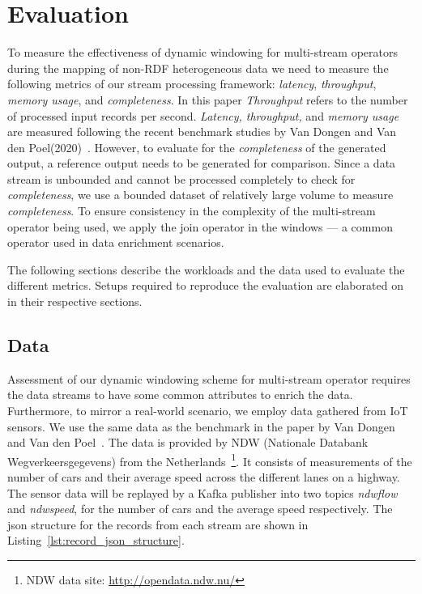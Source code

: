 \chapter{Evaluation}
\label{chap:Evaluation}

To measure the effectiveness of dynamic windowing for multi-stream operators during the 
mapping of non-RDF heterogeneous data we need to measure the following 
metrics of our stream processing framework: \emph{latency}, \emph{throughput},
\emph{memory usage}, and \emph{completeness}. In this paper \emph{Throughput} refers to the number of processed input records per second.
\emph{Latency, throughput,} and \emph{memory usage} are measured following the recent benchmark studies by 
Van Dongen and Van den Poel(2020)~\cite{evalution_of_spe}. 
However, to evaluate 
for the \emph{completeness}
of the generated output, a reference output needs 
to be generated for comparison. Since a data stream is unbounded and cannot be processed completely to check for \emph{completeness}, we use a bounded 
dataset of relatively large volume to measure \emph{completeness}.
To ensure consistency in the complexity of the multi-stream operator being used, 
we apply the join operator in the windows --- a common operator used in 
data enrichment scenarios. 

The following sections describe the workloads and the data used to evaluate the
different metrics. Setups required to reproduce the evaluation are elaborated on
in their respective sections. 


\section{Data}

Assessment of our dynamic windowing scheme for multi-stream operator requires 
the data streams to have some common attributes to enrich the data. Furthermore, to 
mirror a real-world scenario, we employ data gathered from IoT sensors. 
We use the same data 
as the benchmark in the paper by Van Dongen and Van den Poel~\cite{evalution_of_spe}. 
The data is provided by NDW (Nationale Databank Wegverkeersgegevens) from the 
Netherlands~\footnote{NDW data site: \href{http://opendata.ndw.nu/}{http://opendata.ndw.nu/} }.
It consists of measurements of the number of cars and their average speed across the different 
lanes on a highway. 
The sensor data will be replayed by a Kafka publisher into two topics 
\emph{ndwflow} and \emph{ndwspeed}, for the number of cars and the average speed respectively. The json 
structure for the records from each stream are shown in Listing~\ref{lst:record_json_structure}. 


